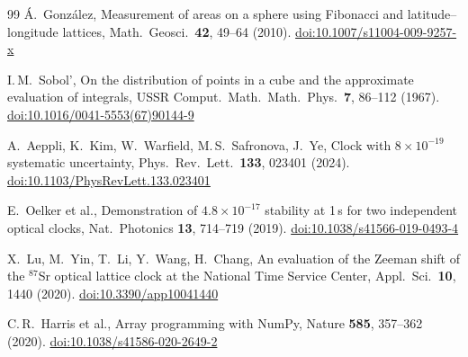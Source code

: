 \documentclass[12pt,a4paper]{article}
\begin{document}
\begin{thebibliography}{99}
\'A.\ Gonz\'alez, Measurement of areas on a sphere using Fibonacci and latitude--longitude lattices,
Math.\ Geosci.\ \textbf{42}, 49--64 (2010).
\href{https://doi.org/10.1007/s11004-009-9257-x}{doi:10.1007/s11004-009-9257-x}

I.\,M.\ Sobol', On the distribution of points in a cube and the approximate evaluation of integrals,
USSR Comput.\ Math.\ Math.\ Phys.\ \textbf{7}, 86--112 (1967).
\href{https://doi.org/10.1016/0041-5553(67)90144-9}{doi:10.1016/0041-5553(67)90144-9}

A.\ Aeppli, K.\ Kim, W.\ Warfield, M.\,S.\ Safronova, J.\ Ye, Clock with $8\times10^{-19}$ systematic uncertainty,
Phys.\ Rev.\ Lett.\ \textbf{133}, 023401 (2024).
\href{https://doi.org/10.1103/PhysRevLett.133.023401}{doi:10.1103/PhysRevLett.133.023401}

E.\ Oelker et al., Demonstration of $4.8\times10^{-17}$ stability at 1\,s for two independent optical clocks,
Nat.\ Photonics \textbf{13}, 714--719 (2019).
\href{https://doi.org/10.1038/s41566-019-0493-4}{doi:10.1038/s41566-019-0493-4}

X.\ Lu, M.\ Yin, T.\ Li, Y.\ Wang, H.\ Chang, An evaluation of the Zeeman shift of the $^{87}$Sr optical lattice clock
at the National Time Service Center, Appl.\ Sci.\ \textbf{10}, 1440 (2020).
\href{https://doi.org/10.3390/app10041440}{doi:10.3390/app10041440}

C.\,R.\ Harris et al., Array programming with NumPy, Nature \textbf{585}, 357--362 (2020).
\href{https://doi.org/10.1038/s41586-020-2649-2}{doi:10.1038/s41586-020-2649-2}

\end{thebibliography}
\end{document}
